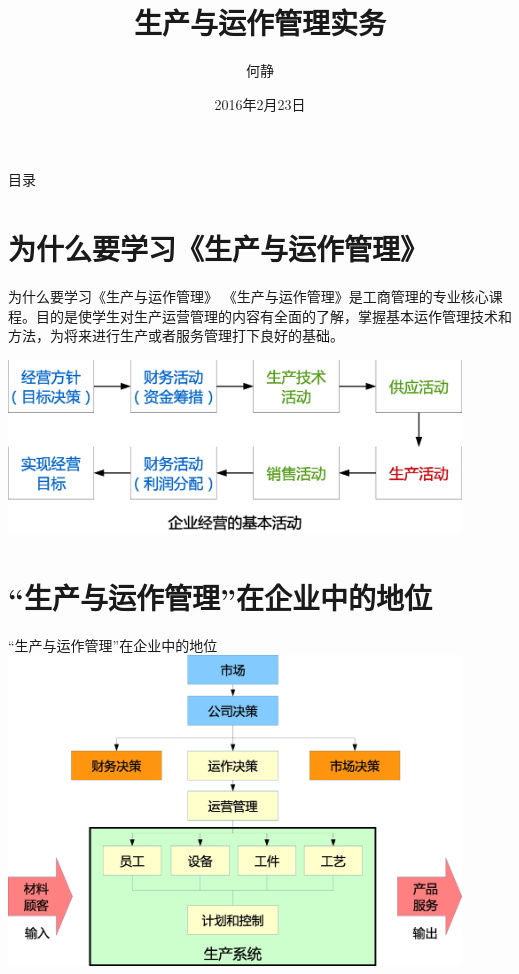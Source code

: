 \documentclass[11pt]{beamer}
\author{何静}
\title{生产与运作管理实务}
\institute{东莞职业技术学院}
\date{2016年2月23日}
\begin{document}
	\maketitle
	
	\begin{frame}{目录}
		\tableofcontents
	\end{frame}
	
	\section{为什么要学习《生产与运作管理》}
	\begin{frame}{为什么要学习《生产与运作管理》}
		《生产与运作管理》是工商管理的专业核心课程。目的是使学生对生产运营管理的内容有全面的了解，掌握基本运作管理技术和方法，为将来进行生产或者服务管理打下良好的基础。
		
		\includegraphics[width=0.9\textwidth]{img/生产活动}
	\end{frame}
	
	\section{“生产与运作管理”在企业中的地位}
	\begin{frame}{“生产与运作管理”在企业中的地位}
		\includegraphics[width=0.9\textwidth]{img/生产系统}
	\end{frame}
	
\end{document}
